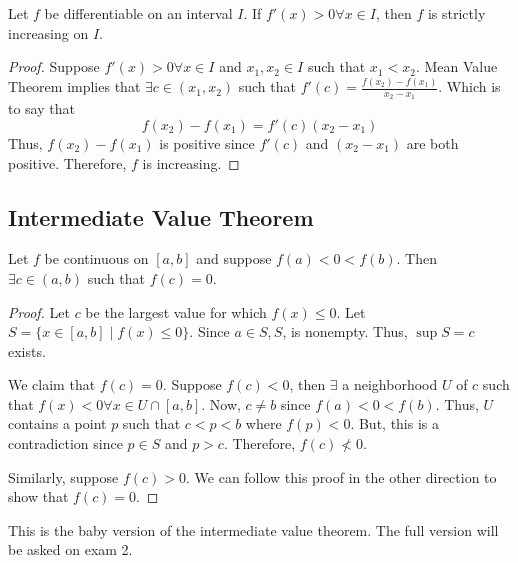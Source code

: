 \begin{theorem}
    Let $f$ be differentiable on an interval $I$. If $f'(x) > 0 \forall x \in I$, then $f$ is strictly increasing on $I$.
\end{theorem}
\begin{proof}
    Suppose $f'(x) > 0 \forall x \in I$ and $x_1, x_2 \in I$ such that $x_1 < x_2$. Mean Value Theorem implies that $\exists c \in (x_1, x_2)$ such that $f'(c) = \frac{f(x_2) - f(x_1)}{x_2 - x_1}$. Which is to say that $$f(x_2) - f(x_1) = f'(c) (x_2 - x_1)$$ Thus, $f(x_2) - f(x_1)$ is positive since $f'(c)$ and $(x_2 - x_1)$ are both positive. Therefore, $f$ is increasing.
\end{proof}

\subsection{Intermediate Value Theorem}
\begin{theorem}
    Let $f$ be continuous on $[a,b]$ and suppose $f(a) < 0 < f(b)$. Then $\exists c \in (a,b)$ such that $f(c) = 0$.
\end{theorem}
\begin{proof}
    Let $c$ be the largest value for which $f(x) \leq 0$. Let $S = \{x \in [a, b] \mid f(x) \leq 0\}$. Since $a \in S, S$, is nonempty. Thus, $\sup S = c$ exists.

    We claim that $f(c) = 0$. Suppose $f(c) < 0$, then $\exists$ a neighborhood $U$ of $c$ such that $f(x) < 0 \forall x \in U \cap [a, b]$. Now, $c \neq b$ since $f(a) < 0 < f(b)$. Thus, $U$ contains a point $p$ such that $c < p < b$ where $f(p) < 0$. But, this is a contradiction since $p \in S$ and $p > c$. Therefore, $f(c) \not< 0$.

    Similarly, suppose $f(c) > 0$. We can follow this proof in the other direction to show that $f(c) = 0$.
\end{proof}
\begin{remark}
    This is the baby version of the intermediate value theorem. The full version will be asked on exam 2.
\end{remark}